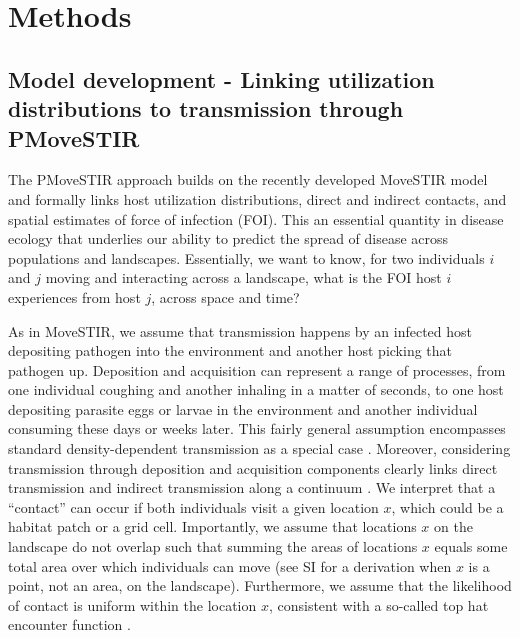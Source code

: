 \documentclass[letterpaper]{article}
\begin{document}
\section*{Methods}

\subsection*{Model development - Linking utilization distributions to transmission through PMoveSTIR}

The PMoveSTIR approach builds on the recently developed MoveSTIR model \citep{Wilber2022} and formally links host utilization distributions, direct and indirect contacts, and spatial estimates of force of infection (FOI). This an essential quantity in disease ecology that underlies our ability to predict the spread of disease across populations and landscapes. Essentially, we want to know, for two individuals $i$ and $j$ moving and interacting across a landscape, what is the FOI host $i$ experiences from host $j$, across space and time?  

As in MoveSTIR, we assume that transmission happens by an infected host depositing pathogen into the environment and another host picking that pathogen up. 
Deposition and acquisition can represent a range of processes, from one individual coughing and another inhaling in a matter of seconds, to one host depositing parasite eggs or larvae in the environment and another individual consuming these  days or weeks later. 
This fairly general assumption encompasses standard density-dependent transmission as a special case \citep{Cortez2021}. 
Moreover, considering transmission through deposition and acquisition components clearly links direct transmission and indirect transmission along a continuum \citep{Wilber2022}.
We interpret that a ``contact'' can occur if both individuals visit a given location $x$, which could be a habitat patch or a grid cell. 
Importantly, we assume that locations $x$ on the landscape do not overlap such that summing the areas of locations $x$ equals some total area over which individuals can move (see SI for a derivation when $x$ is a point, not an area, on the landscape). 
Furthermore, we assume that the likelihood of contact is uniform within the location $x$, consistent with a so-called top hat encounter function \citep{Gurarie2013,Wilber2022}.
\end{document}

